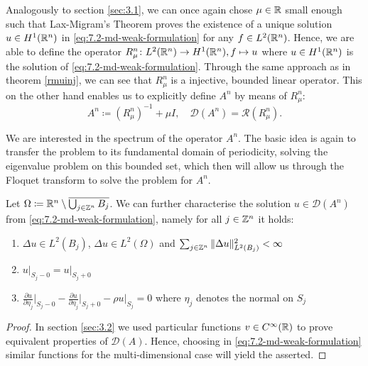 Analogously to section \ref{sec:3.1}, we can once again chose $\mu \in \mathbb{R}$ small enough such that Lax-Migram's Theorem proves the existence of a unique solution $u \in H^{1}(\mathbb{R}^{n})$ in \eqref{eq:7.2-md-weak-formulation} for any $f \in L^{2}(\mathbb{R}^{n})$. Hence, we are able to define the operator $R_{\mu}^{n} \colon L^{2}(\mathbb{R}^{n}) \rightarrow H^{1}(\mathbb{R}^{n}), f \mapsto u$ where $u \in H^{1}(\mathbb{R}^{n})$ is the solution of \eqref{eq:7.2-md-weak-formulation}. Through the same approach as in theorem \ref{rmuinj}, we can see that $R_{\mu}^{n}$ is a injective, bounded linear operator. This on the other hand enables us to explicitly define $A^{n}$ by means of $R_{\mu}^{n}$:
\[ A^{n} \coloneqq \left(R_{\mu}^{n}\right)^{-1} + \mu I, \quad \mathcal{D}(A^{n}) = \mathcal{R}(R_{\mu}^{n}). \]

We are interested in the spectrum of the operator $A^{n}$. The basic idea is again to transfer the problem to its fundamental domain of periodicity, solving the eigenvalue problem on this bounded set, which then will allow us through the Floquet transform to solve the problem for $A^{n}$.

\begin{theorem} Let $\Omega \coloneqq \mathbb{R}^{n} \setminus \overline{\bigcup_{j \in \mathbb{Z}^{n}} B_{j}}$. We can further characterise the solution $u \in \mathcal{D}(A^{n})$ from \eqref{eq:7.2-md-weak-formulation}, namely for all $j \in \mathbb{Z}^{n}$ it holds:
	\begin{enumerate}
		\item $\Delta u \in L^{2}(B_{j})$, $\Delta u \in L^{2}(\Omega)$ and $\sum_{j \in \mathbb{Z}^{n}} \|\Delta u \|_{L^{2}(B_{j})}^{2} < \infty$
		\item $u \big|_{S_{j} - 0} = u \big|_{S_{j} + 0}$
		\item $\frac{\partial u}{\partial \eta_{j}} \big|_{S_{j} - 0} - \frac{\partial u}{\partial \eta_{j}} \big|_{S_{j} + 0} - \rho u \big|_{S_{j}} = 0$ where $\eta_{j}$ denotes the normal on $S_{j}$
	\end{enumerate}
	
	\begin{proof}
 		In section \ref{sec:3.2} we used particular functions $v \in C^{\infty}(\mathbb{R})$ to prove equivalent properties of $\mathcal{D}(A)$. Hence, choosing in \eqref{eq:7.2-md-weak-formulation} similar functions for the multi-dimensional case will yield the asserted. 
	\end{proof}
\end{theorem}

